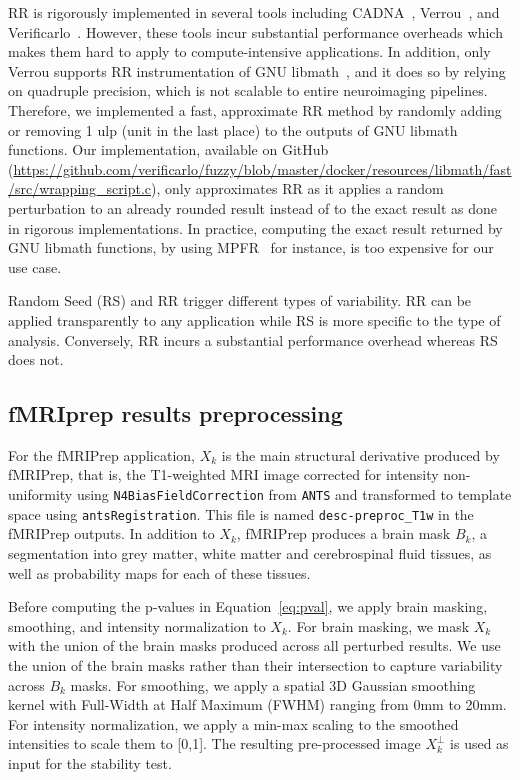 \documentclass[lettersize,journal]{IEEEtran}
\newcommand{\fmriprep}{fMRIPrep\xspace}
\newcommand{\fwhm}{\textsc{FWHM}}
\begin{document}
RR is rigorously implemented in several tools including CADNA~\cite{jezequel2008cadna}, Verrou~\cite{fevotte2016verrou}, and Verificarlo~\cite{denis2016verificarlo}.
However, these tools incur substantial performance overheads which makes them hard to apply to compute-intensive applications. In addition, only Verrou supports RR instrumentation of GNU libmath~\cite{fevotte2019debugging}, and it does so by relying on quadruple precision, which is not scalable to entire neuroimaging pipelines.
Therefore, we implemented a fast, approximate RR method by randomly adding or removing 1 ulp (unit in the last place) to the outputs of GNU libmath functions.
Our implementation, available on GitHub (\url{https://github.com/verificarlo/fuzzy/blob/master/docker/resources/libmath/fast/src/wrapping\_script.c}),  only approximates RR as it applies a random perturbation to an already rounded result instead of to the exact result as done in rigorous implementations. In practice, computing the exact result returned by GNU libmath functions, by using MPFR~\cite{fousse2007mpfr} for instance, is too expensive for our use case.

Random Seed (RS) and RR trigger different types of variability. RR can be applied transparently to any application while RS is more specific to the type of analysis. Conversely, RR incurs a substantial performance overhead whereas RS does not.

\subsection{fMRIprep results preprocessing}

For the \fmriprep application, $X_k$ is the main structural derivative produced by \fmriprep, that is, the T1-weighted MRI image corrected for intensity non-uniformity using \texttt{N4BiasFieldCorrection} from \texttt{ANTS} and transformed to template space using \texttt{antsRegistration}. This file is named \texttt{desc-preproc\_T1w} in the \fmriprep outputs. In addition to $X_k$, \fmriprep produces a brain mask $B_k$, a segmentation into grey matter, white matter and cerebrospinal fluid tissues, as well as probability maps for each of these tissues.

Before computing the p-values in Equation~\ref{eq:pval}, we apply brain masking, smoothing, and intensity normalization to $X_k$. For brain masking, we mask $X_k$ with the union of the brain masks produced across all perturbed results. We use the union of the brain masks rather than their intersection to capture variability across $B_k$ masks. For smoothing, we apply a spatial 3D Gaussian smoothing kernel with Full-Width at Half Maximum (\fwhm) ranging from 0mm to 20mm. For intensity normalization, we apply a min-max scaling to the smoothed intensities to scale them to [0,1].
The resulting pre-processed image $X_k^\perp$ is used as input for the stability test.
\end{document}
